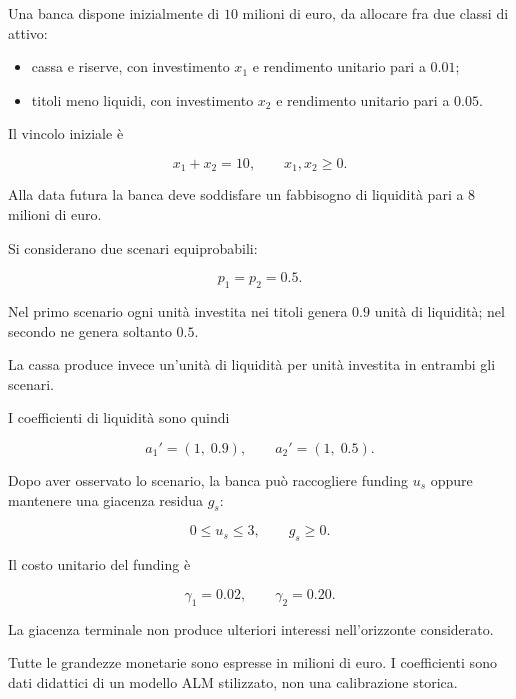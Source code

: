 \begin{exercise}

\label{ex:cap15-sp-ws-ev}

Una banca dispone inizialmente
di $10$ milioni di euro, da allocare
fra due classi di attivo:

\begin{itemize}

\item cassa e riserve, con investimento $x_1$
e rendimento unitario pari a $0.01$;

\item titoli meno liquidi, con investimento $x_2$
e rendimento unitario pari a $0.05$.

\end{itemize}

Il vincolo iniziale \`e

\[
x_1+x_2=10,
\qquad
x_1,x_2\geq0.
\]

Alla data futura la banca deve soddisfare
un fabbisogno di liquidit\`a
pari a $8$ milioni di euro.

Si considerano due scenari equiprobabili:

\[
p_1=p_2=0.5.
\]

Nel primo scenario ogni unit\`a
investita nei titoli genera $0.9$
unit\`a di liquidit\`a;
nel secondo ne genera soltanto $0.5$.

La cassa produce invece un'unit\`a
di liquidit\`a per unit\`a investita
in entrambi gli scenari.

I coefficienti di liquidit\`a sono quindi

\[
a_1'=(1,\;0.9),
\qquad
a_2'=(1,\;0.5).
\]

Dopo aver osservato lo scenario,
la banca pu\`o raccogliere funding $u_s$
oppure mantenere una giacenza residua $g_s$:

\[
0\leq u_s\leq3,
\qquad
g_s\geq0.
\]

Il costo unitario del funding \`e

\[
\gamma_1=0.02,
\qquad
\gamma_2=0.20.
\]

La giacenza terminale non produce
ulteriori interessi nell'orizzonte
considerato.

Tutte le grandezze monetarie
sono espresse in milioni di euro.
I coefficienti sono dati didattici
di un modello ALM stilizzato,
non una calibrazione storica.

\begin{enumerate}


\end{enumerate}
\end{exercise}
